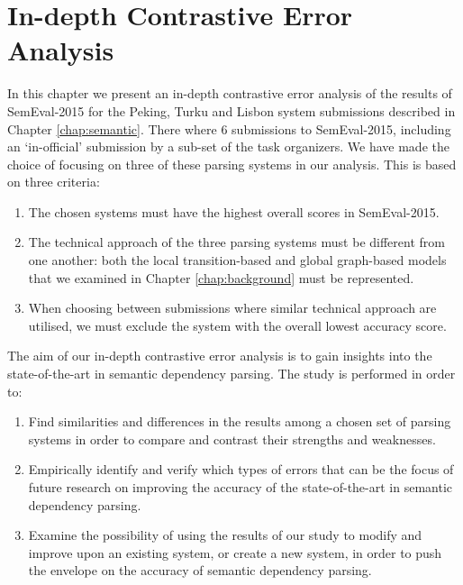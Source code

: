 \chapter{In-depth Contrastive Error Analysis}
\label{chap:analysis}



In this chapter we present an in-depth contrastive error analysis of the results of SemEval-2015 for the Peking, Turku and Lisbon system submissions described in Chapter \ref{chap:semantic}. There where 6 submissions to SemEval-2015, including an `in-official' submission by a sub-set of the task organizers. We have made the choice of focusing on three of these parsing systems in our analysis. This is based on three criteria:

\begin{enumerate}
    \item The chosen systems must have the highest overall scores in SemEval-2015.
    \item The technical approach of the three parsing systems must be different from one another: both the local transition-based and global graph-based models that we examined in Chapter \ref{chap:background} must be represented.
    \item When choosing between submissions where similar technical approach are utilised, we must exclude the system with the overall lowest accuracy score.
\end{enumerate}

The aim of our in-depth contrastive error analysis is to gain insights into the state-of-the-art in semantic dependency parsing. The study is performed in order to:

\begin{enumerate}
    \item Find similarities and differences in the results among a chosen set of parsing systems in order to compare and contrast their strengths and weaknesses.
    \item Empirically identify and verify which types of errors that can be the focus of future research on improving the accuracy of the state-of-the-art in semantic dependency parsing.
    \item Examine the possibility of using the results of our study to modify and improve upon an existing system, or create a new system, in order to push the envelope on the accuracy of semantic dependency parsing.
\end{enumerate}

